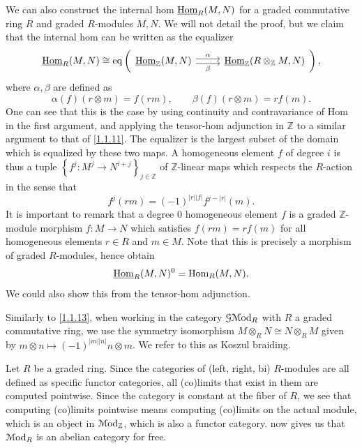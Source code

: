 \begin{discussion}\label{1.4.17}
	We can also construct the internal hom $\underline{\operatorname{Hom}}_R(M,N)$ for a graded commutative ring $R$ and graded $R$-modules $M,N$. We will not detail the proof, but we claim that the internal hom can be written as the equalizer
	\[
	\underline{\Hom}_R(M,N) \cong \operatorname{eq}\left(
		\begin{tikzcd}[column sep=2.5em]
			\underline{\Hom}_\mathbb{Z}(M,N) \ar[" \alpha ", shift left, r] \ar[" \beta "', shift right, r] & \underline{\Hom}_\mathbb{Z}(R \otimes_\mathbb{Z} M, N) \end{tikzcd}
\right)
	,\]
	where $\alpha ,\beta $ are defined as
	\[
		\alpha (f)(r\otimes m) = f(rm),\qquad \beta (f)(r\otimes m)=rf(m)
	.\]
	One can see that this is the case by using continuity and contravariance of Hom in the first argument, and applying the tensor-hom adjunction in $\mathbb{Z} $ to a similar argument to that of \cref{1.1.11}. The equalizer is the largest subset of the domain which is equalized by these two maps. A homogeneous element $f$ of degree $i$ is thus a tuple $\left\{ f^j : M^j \to N^{i+j}  \right\} _{j\in\mathbb{Z} } $ of $\mathbb{Z} $-linear maps which respects the $R$-action in the sense that
	\[
		f^j(rm) =(-1)^{\left| r \right| \left| f \right| } f^{j-\left| r \right| }(m)
	.\]
	It is important to remark that a degree 0 homogeneous element $f$ is a graded $\mathbb{Z} $-module morphism $f : M \to N$ which satisfies $f(rm)=rf(m)$ for all homogeneous elements $r\in R$ and $m\in M$. Note that this is precisely a morphism of graded $R$-modules, hence obtain
	\[
		\underline{\operatorname{Hom}}_R(M,N)^0 = \operatorname{Hom}_R(M,N)
	.\]
	We could also show this from the tensor-hom adjunction.
\end{discussion}

\begin{remark}\label{1.4.18}
	Similarly to \cref{1.1.13}, when working in the category $\mathcal{G} \mathcal{M}\mathrm{od} _R$ with $R$ a graded commutative ring, we use the symmetry isomorphism $M\otimes _R N \cong N\otimes _R M$ given by $m\otimes n\mapsto (-1)^{\left| m \right| \left| n \right| } n\otimes m$. We refer to this as Koszul braiding.
\end{remark}

\begin{remark}
	Let $R$ be a graded ring. Since the categories of (left, right, bi) $R$-modules are all defined as specific functor categories, all (co)limits that exist in them are computed pointwise. Since the category is constant at the fiber of $R$, we see that computing (co)limits pointwise means computing (co)limits on the actual module, which is an object in $\mathcal{M}\mathrm{od} _\mathbb{Z} $, which is also a functor category.  now gives us that $\mathcal{M}\mathrm{od}_R$ is an abelian category for free.
\end{remark}

